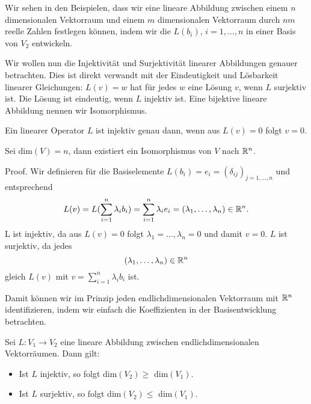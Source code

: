 Wir sehen in den Beispielen, dass wir eine lineare Abbildung zwischen einem \(n\) dimensionalen Vektorraum und einem \(m\) dimensionalen Vektorraum durch \(nm\) reelle Zahlen festlegen können, indem wir die \(L(b_i)\), \(i=1,\ldots,n\) in einer Basis von \(V_2\) entwickeln.

Wir wollen nun die Injektivität und Surjektivität linearer Abbildungen genauer betrachten. Dies ist direkt verwandt mit der Eindeutigkeit und Lösbarkeit linearer Gleichungen: \(L(v) = w\) hat für jedes \(w\) eine Lösung \(v\), wenn \(L\) surjektiv ist. Die Lösung ist eindeutig, wenn \(L\) injektiv ist. Eine bijektive lineare Abbildung nennen wir Isomorphismus.
\label{vektorraeume/LineareAbb:lemma-4}
\begin{lemma}{}{}



Ein linearer Operator \(L\) ist injektiv genau dann, wenn aus \(L(v) = 0\) folgt \(v=0\).
\end{lemma}
\label{vektorraeume/LineareAbb:theorem-5}
\begin{theorem}{}{}



Sei dim\((V) =n\), dann existiert ein Isomorphismus von \(V\) nach \(\mathbb{R}^n\).
\end{theorem}

\begin{emphBox}{}{}
Proof.  Wir definieren für die Basiselemente \(L(b_i) = e_i = (\delta_{ij})_{j=1,\ldots,n}\) und entsprechend
\begin{equation*}
 L(v) = L(\sum_{i=1}^n \lambda_i b_i) = \sum_{i=1}^n \lambda_i e_i = (\lambda_1, \ldots, \lambda_n) \in \mathbb{R}^n .
\end{equation*}
L ist injektiv, da aus \(L(v) = 0\) folgt \(\lambda_1=\ldots,\lambda_n = 0\) und damit \(v=0\). \(L\) ist surjektiv, da jedes
\begin{equation*}
 (\lambda_1, \ldots, \lambda_n) \in \mathbb{R}^n\end{equation*}
gleich \(L(v)\) mit \(v = \sum_{i=1}^n \lambda_i b_i\) ist.
\end{emphBox}

Damit können wir im Prinzip jeden endlichdimensionalen Vektorraum mit \(\mathbb{R}^n\) identifizieren, indem wir einfach die Koeffizienten in der Basisentwicklung betrachten.
\label{vektorraeume/LineareAbb:theorem-6}
\begin{theorem}{}{}



Sei \(L: V_1 \rightarrow V_2\) eine lineare Abbildung zwischen endlichdimensionalen Vektorräumen. Dann gilt:
\begin{itemize}
\item {} 
Ist \(L\) injektiv, so folgt dim\((V_2) \geq \) dim\((V_1)\).

\item {} 
Ist \(L\) surjektiv, so folgt dim\((V_2) \leq \) dim\((V_1)\).

\end{itemize}
\end{theorem}

